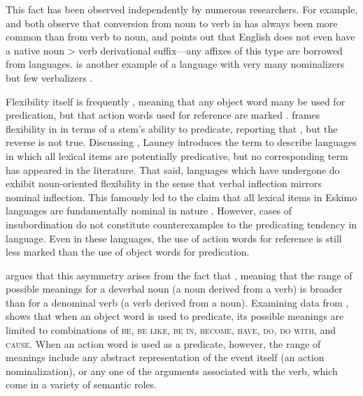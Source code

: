 This fact has been observed independently by numerous researchers. For example, \textcite[251]{Stevick1968} and \textcite[373--374]{Marchand1969} both observe that conversion from noun to verb in  has always been more common than from verb to noun, and \textcite[98]{Kastovsky1996} points out that English does not even have a native noun > verb derivational suffix—any affixes of this type are borrowed from  languages.  is another example of a language with very many nominalizers but few verbalizers \parencite[158]{Mithun2017}.

Flexibility itself is frequently , meaning that any object word many be used for predication, but that action words used for reference are marked \parencites[69]{Croft2001b}[§3.3]{EvansOsada2005}{Beck2013}. \textcite[44]{Nakayama2001} frames flexibility in  in terms of a stem's ability to predicate, reporting that , but the reverse is not true. Discussing , Launey \parencites*{Launey1994}{Launey2004} introduces the term  to describe languages in which all lexical items are potentially predicative, but no corresponding term  has appeared in the literature. That said, languages which have undergone   do exhibit noun-oriented flexibility in the sense that verbal inflection mirrors nominal inflection. This famously led to the claim that all lexical items in Eskimo languages are fundamentally nominal in nature \parencite{Sadock1999}. However, cases of insubordination do not constitute counterexamples to the predicating tendency in language. Even in these languages, the use of action words for reference is still less marked than the use of object words for predication.

\textcite{Kastovsky1996} argues that this asymmetry arises from the fact that , meaning that the range of possible meanings for a deverbal noun (a noun derived from a verb) is broader than for a denominal verb (a verb derived from a noun). Examining data from , \citeauthor{Kastovsky1996} shows that when an object word is used to predicate, its possible meanings are limited to combinations of \textsc{be}, \textsc{be like}, \textsc{be in}, \textsc{become}, \textsc{have}, \textsc{do}, \textsc{do with}, and \textsc{cause}. When an action word is used as a predicate, however, the range of meanings include any abstract representation of the event itself (an action nominalization), or any one of the arguments associated with the verb, which come in a variety of semantic roles.

